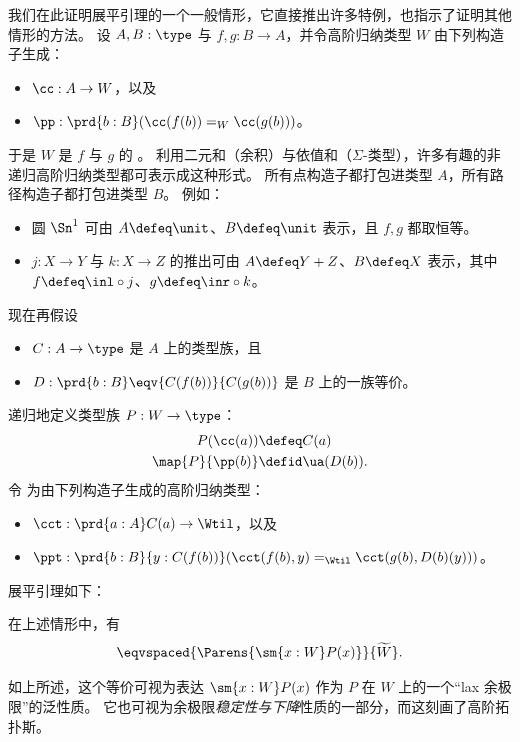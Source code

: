 我们在此证明展平引理的一个一般情形，它直接推出许多特例，也指示了证明其他情形的方法。
设 $A,B:\type$ 与 $f,g:B\to{}A$，并令高阶归纳类型 $W$ 由下列构造子生成：
\begin{itemize}
\item $\cc:A\to{}W$，以及
\item $\pp:\prd{b:B} (\cc(f(b))=_W\cc(g(b)))$。
\end{itemize}
于是 $W$ 是 $f$ 与 $g$ 的
%
%
。
利用二元和（余积）与依值和（$\Sigma$-类型），许多有趣的非递归高阶归纳类型都可表示成这种形式。
所有点构造子都打包进类型 $A$，所有路径构造子都打包进类型 $B$。
例如：
\begin{itemize}
\item 圆 $\Sn^1$ 可由 $A\defeq \unit$、$B\defeq \unit$ 表示，且 $f,g$ 都取恒等。
\item $j:X\to Y$ 与 $k:X\to Z$ 的推出可由 $A\defeq Y+Z$、$B\defeq X$ 表示，其中 $f\defeq \inl \circ j$、$g\defeq \inr\circ k$。
\end{itemize}
现在再假设
\begin{itemize}
\item $C:A\to\type$ 是 $A$ 上的类型族，且
\item $D:\prd{b:B}\eqv{C(f(b))}{C(g(b))}$ 是 $B$ 上的一族等价。
\end{itemize}
递归地定义类型族 $P : W\to\type$：
\begin{align*}
  P(\cc(a)) &\defeq C(a)\\
  \map{P}{\pp(b)} &\defid \ua(D(b)).
\end{align*}
令 \Wtil 为由下列构造子生成的高阶归纳类型：
\begin{itemize}
\item $\cct:\prd{a:A} C(a) \to \Wtil$，以及
\item $\ppt:\prd{b:B}{y:C(f(b))} (\cct(f(b),y)=_{\Wtil}\cct(g(b),D(b)(y)))$。
\end{itemize}

展平引理如下：

\begin{lem}[展平引理]\label{thm:flattening}
  在上述情形中，有
  \[ \eqvspaced{\Parens{\sm{x:W} P(x)}}{\widetilde{W}}. \]
\end{lem}

%
如上所述，这个等价可视为表达 $\sm{x:W} P(x)$ 作为 $P$ 在 $W$ 上的一个“lax 余极限”的泛性质。
它也可视为余极限\emph{稳定性与下降}性质的一部分，而这刻画了高阶拓扑斯。%
%
%

